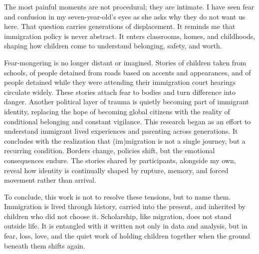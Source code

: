 The most painful moments are not procedural; they are intimate. I have seen fear and confusion in my seven-year-old’s eyes as she asks why they do not want us here. That question carries generations of displacement. It reminds me that immigration policy is never abstract. It enters classrooms, homes, and childhoods, shaping how children come to understand belonging, safety, and worth.

Fear-mongering is no longer distant or imagined. Stories of children taken from schools, of people detained from roads based on accents and appearances, and of people detained while they were attending their immigration court hearings circulate widely. These stories attach fear to bodies and turn difference into danger. Another political layer of trauma is quietly becoming part of immigrant identity, replacing the hope of becoming global citizens with the reality of conditional belonging and constant vigilance.
This research began as an effort to understand immigrant lived experiences and parenting across generations. It concludes with the realization that (im)migration is not a single journey, but a recurring condition. Borders change, policies shift, but the emotional consequences endure. The stories shared by participants, alongside my own, reveal how identity is continually shaped by rupture, memory, and forced movement rather than arrival.

To conclude, this work is not to resolve these tensions, but to name them. Immigration is lived through history, carried into the present, and inherited by children who did not choose it. Scholarship, like migration, does not stand outside life. It is entangled with it written not only in data and analysis, but in fear, loss, love, and the quiet work of holding children together when the ground beneath them shifts again.

